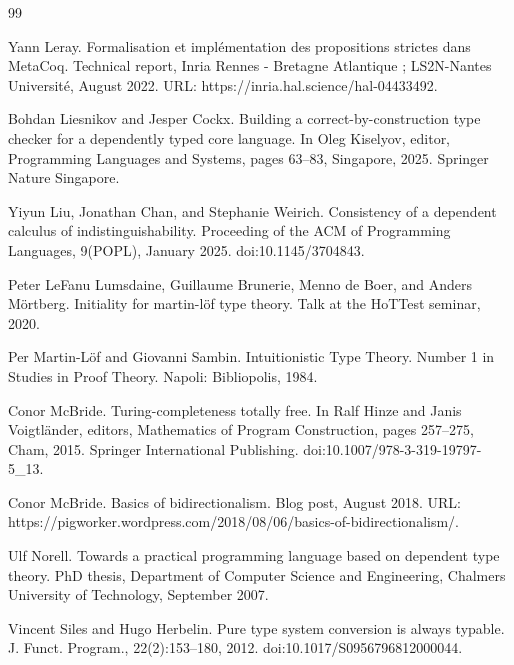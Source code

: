 \documentclass[10pt,a4paper]{amsart}
\begin{document}
\begin{thebibliography}{99}
\par\noindent  [36]  Yann Leray.  Formalisation et implémentation des propositions strictes dans MetaCoq.  Technical report, Inria Rennes - Bretagne Atlantique ; LS2N-Nantes Université, August 2022.  URL: https://inria.hal.science/hal-04433492.  
 
\par\noindent  [37]  Bohdan Liesnikov and Jesper Cockx.  Building a correct-by-construction type checker for a dependently typed core language.  In Oleg Kiselyov, editor, Programming Languages and Systems, pages 63–83, Singapore, 2025. Springer Nature Singapore.  
 
\par\noindent  [38]  Yiyun Liu, Jonathan Chan, and Stephanie Weirich.  Consistency of a dependent calculus of indistinguishability.  Proceeding of the ACM of Programming Languages, 9(POPL), January 2025.  doi:10.1145/3704843.  
 
\par\noindent  [39]  Peter LeFanu Lumsdaine, Guillaume Brunerie, Menno de Boer, and Anders Mörtberg.  Initiality for martin-löf type theory.  Talk at the HoTTest seminar, 2020.  
 
\par\noindent  [40]  Per Martin-Löf and Giovanni Sambin.  Intuitionistic Type Theory.  Number 1 in Studies in Proof Theory. Napoli: Bibliopolis, 1984.  
 
\par\noindent  [41]  Conor McBride.  Turing-completeness totally free.  In Ralf Hinze and Janis Voigtländer, editors, Mathematics of Program Construction, pages 257–275, Cham, 2015. Springer International Publishing.  doi:10.1007/978-3-319-19797-5\_13.  
 
\par\noindent  [42]  Conor McBride.  Basics of bidirectionalism.  Blog post, August 2018.  URL: https://pigworker.wordpress.com/2018/08/06/basics-of-bidirectionalism/.  
 
\par\noindent  [43]  Ulf Norell.  Towards a practical programming language based on dependent type theory.  PhD thesis, Department of Computer Science and Engineering, Chalmers University of Technology, September 2007.  
 
\par\noindent  [44]  Vincent Siles and Hugo Herbelin.  Pure type system conversion is always typable.  J. Funct. Program., 22(2):153–180, 2012.  doi:10.1017/S0956796812000044.  
 

\end{thebibliography}
\end{document}
